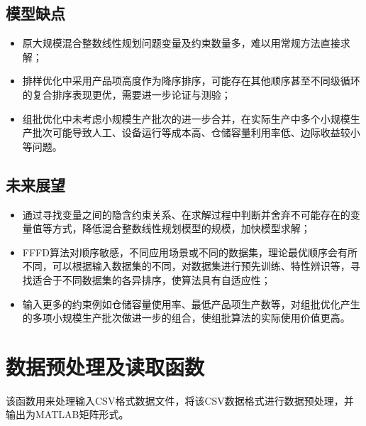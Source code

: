 \documentclass[bwprint]{gmcmthesis}
\begin{document}
\subsection{模型缺点}
\begin{itemize}
    \item 原大规模混合整数线性规划问题变量及约束数量多，难以用常规方法直接求解；
    \item 排样优化中采用产品项高度作为降序排序，可能存在其他顺序甚至不同级循环的复合排序表现更优，需要进一步论证与测验；
    \item 组批优化中未考虑小规模生产批次的进一步合并，在实际生产中多个小规模生产批次可能导致人工、设备运行等成本高、仓储容量利用率低、边际收益较小等问题。
\end{itemize}

\subsection{未来展望}
\begin{itemize}
	\item 通过寻找变量之间的隐含约束关系、在求解过程中判断并舍弃不可能存在的变量值等方式，降低混合整数线性规划模型的规模，加快模型求解；
	\item FFFD算法对顺序敏感，不同应用场景或不同的数据集，理论最优顺序会有所不同，可以根据输入数据集的不同，对数据集进行预先训练、特性辨识等，寻找适合于不同数据集的各异排序，使算法具有自适应性；
	\item 输入更多的约束例如仓储容量使用率、最低产品项生产数等，对组批优化产生的多项小规模生产批次做进一步的组合，使组批算法的实际使用价值更高。
\end{itemize}



\newpage
\quad
\newpage





\cite{mittelbach_latex_2004,wright_latex3_2009,beeton_unicode_2008,vieth_experiences_2009}

\newpage
\appendix
\newpage
\section{数据预处理及读取函数}\label{数据预处理及读取函数}
该函数用来处理输入CSV格式数据文件，将该CSV数据格式进行数据预处理，并输出为MATLAB矩阵形式。
\end{document}
